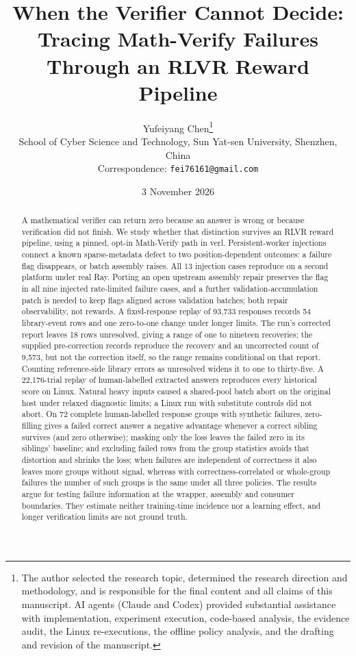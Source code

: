 \documentclass[10pt,a4paper]{article}
\title{When the Verifier Cannot Decide: Tracing {Math-Verify} Failures\\
Through an {RLVR} Reward Pipeline }
\author{Yufeiyang Chen\thanks{The author selected the research topic,
determined the research direction and methodology, and is responsible for
the final content and all claims of this manuscript. AI agents (Claude and
Codex) provided substantial assistance with implementation, experiment
execution, code-based analysis, the evidence audit, the Linux
re-executions, the offline policy analysis, and the drafting and revision
of the manuscript.}\\[2pt]
School of Cyber Science and Technology, Sun Yat-sen University, Shenzhen, China\\
Correspondence: \texttt{fei76161@gmail.com}}
\date{3 November 2026}
\begin{document}
\maketitle

\begin{abstract}
A mathematical verifier can return zero because an answer is wrong or
because verification did not finish. We study whether that distinction
survives an RLVR reward pipeline, using a pinned, opt-in Math-Verify path in
verl. Persistent-worker injections connect a known sparse-metadata defect
to two position-dependent outcomes: a failure flag disappears, or batch
assembly raises. All 13 injection cases reproduce on a second platform
under real Ray. Porting an open upstream assembly repair preserves the flag
in all nine injected rate-limited failure cases, and a further
validation-accumulation patch is needed to keep flags aligned across
validation batches; both repair observability, not rewards. A
fixed-response replay of 93,733 responses records 54 library-event rows and
one zero-to-one change under longer limits. The run's corrected report
leaves 18 rows unresolved, giving a range of one to nineteen recoveries;
the supplied pre-correction records reproduce the recovery and an
uncorrected count of 9,573, but not the correction itself, so the range
remains conditional on that report. Counting reference-side library errors
as unresolved widens it to one to thirty-five. A 22,176-trial replay of
human-labelled extracted answers reproduces every historical score on
Linux. Natural heavy inputs caused a shared-pool batch abort on the original
host under relaxed diagnostic limits; a Linux run with substitute controls
did not abort. On 72 complete human-labelled response groups with synthetic
failures, zero-filling gives a failed correct answer a negative advantage
whenever a correct sibling survives (and zero otherwise); masking only the
loss leaves the failed zero in its siblings' baseline; and excluding failed
rows from the group statistics avoids that distortion and shrinks the loss;
when failures are independent of correctness it also leaves more groups
without signal, whereas with correctness-correlated or whole-group failures
the number of such groups is the same under all three policies.
The results argue for testing failure information at the wrapper, assembly
and consumer boundaries. They estimate neither training-time incidence nor
a learning effect, and longer verification limits are not ground truth.
\end{abstract}
\end{document}

